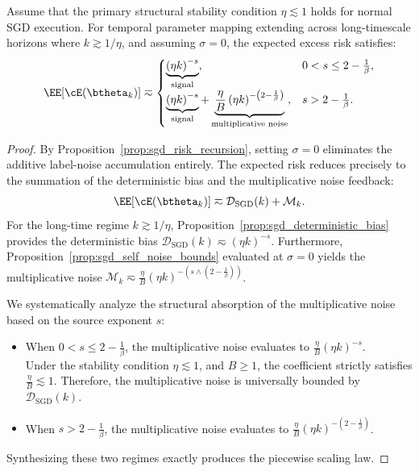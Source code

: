 \begin{theorem}
\label{thm:sgd_scaling_law_noiseless}
Assume that the primary structural stability condition \(\eta\lesssim1\) holds for normal SGD execution. For temporal parameter mapping extending across long-timescale horizons where \(k \gtrsim 1/\eta\), and assuming \(\sigma=0\), the expected excess risk satisfies:
\begin{equation}
\EE[\cE(\btheta_k)]
\eqsim
\begin{cases}
\underbrace{ \left(\eta k\right)^{-s} }_{\text{signal}}, & 0 < s \le 2-\frac{1}{\beta}, \\[12pt]
\underbrace{ \left(\eta k\right)^{-s} }_{\text{signal}} + \underbrace{ \frac{\eta}{B}\left(\eta k\right)^{-\left(2-\frac{1}{\beta}\right)} }_{\text{multiplicative noise}}, & s > 2-\frac{1}{\beta}.
\end{cases}
\end{equation}
\end{theorem}

\begin{proof}
By Proposition~\ref{prop:sgd_risk_recursion}, setting \(\sigma=0\) eliminates the additive label-noise accumulation entirely. The expected risk reduces precisely to the summation of the deterministic bias and the multiplicative noise feedback:
\[
    \EE[\cE(\btheta_k)] \eqsim \mathcal{D}_{\mathrm{SGD}}(k) + \mathcal{M}_k.
\]
For the long-time regime \(k \gtrsim 1/\eta\), Proposition~\ref{prop:sgd_deterministic_bias} provides the deterministic bias \(\mathcal{D}_{\mathrm{SGD}}(k) \eqsim (\eta k)^{-s}\).
Furthermore, Proposition~\ref{prop:sgd_self_noise_bounds} evaluated at \(\sigma=0\) yields the multiplicative noise \(\mathcal{M}_k \eqsim \frac{\eta}{B} (\eta k)^{-\left(s \wedge \left(2-\frac{1}{\beta}\right)\right)}\).

We systematically analyze the structural absorption of the multiplicative noise based on the source exponent \(s\):
\begin{itemize}
    \item When \(0 < s \le 2-\frac{1}{\beta}\), the multiplicative noise evaluates to \(\frac{\eta}{B} (\eta k)^{-s}\). \\
    Under the stability condition \(\eta \lesssim 1\), and \(B \ge 1\), the coefficient strictly satisfies \(\frac{\eta}{B} \lesssim 1\). Therefore, the multiplicative noise is universally bounded by \(\mathcal{D}_{\mathrm{SGD}}(k)\).
    \item When \(s > 2-\frac{1}{\beta}\), the multiplicative noise evaluates to \(\frac{\eta}{B} (\eta k)^{-\left(2-\frac{1}{\beta}\right)}\). 
\end{itemize}
Synthesizing these two regimes exactly produces the piecewise scaling law.
\end{proof}








